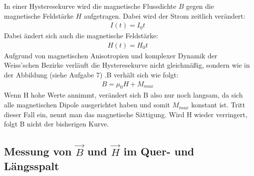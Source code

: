 \documentclass[a4paper,10pt]{scrartcl}
\begin{document}
		In einer Hysteresekurve wird die magnetische Flussdichte \(B\) gegen die magnetische Feldstärke \(H\) aufgetragen. Dabei wird der Strom zeitlich verändert:
		\begin{align}
		I(t)=I_{0}t
		\end{align}
		Dabei ändert sich auch die magnetische Feldstärke:
		\begin{align}
		H(t)=H_{0}t
		\end{align}
		Aufgrund von magnetischen Anisotropien und komplexer Dynamik der Weiss'schen Bezirke verläuft die Hysteresekurve nicht gleichmäßig, sondern wie in der Abbildung (siehe Aufgabe 7) .B verhält sich wie folgt:
		\begin{align}
		B=\mu_{0}H+M_{max}
		\end{align}
		Wenn H hohe Werte annimmt, verändert sich B also nur noch langsam, da sich alle magnetischen Dipole ausgerichtet haben und somit \(M_{max}\) konstant ist. Tritt dieser Fall ein, nennt man das magnetische Sättigung. Wird H wieder verringert, folgt B nicht der bisherigen Kurve.
		\newpage
		
	\subsection{Messung von \(\vec{B}\) und \(\vec{H}\) im Quer- und Längsspalt}
	
\end{document}
